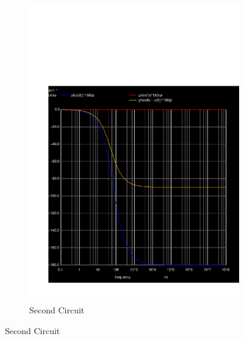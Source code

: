 \begin{figure}[h]
\begin{subfigure}{0.4\textwidth}
\includegraphics[width=\textwidth]{sim5_ph.pdf}
\caption{Second Circuit}
\label{fig:second}
\end{subfigure}

\end{figure}




